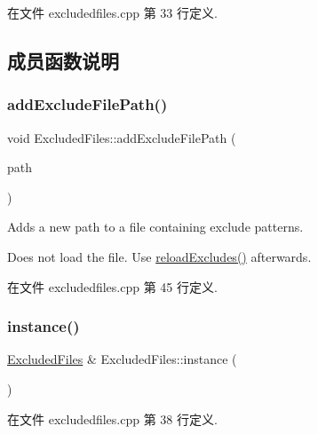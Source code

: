 在文件 excludedfiles.\+cpp 第 33 行定义.



\subsection{成员函数说明}
\mbox{\label{class_o_c_c_1_1_excluded_files_abd7010e5b9734d3870ce40e607b16a53}} 
\subsubsection{\texorpdfstring{add\+Exclude\+File\+Path()}{addExcludeFilePath()}}
{\footnotesize\ttfamily void Excluded\+Files\+::add\+Exclude\+File\+Path (\begin{DoxyParamCaption}\item[{const Q\+String \&}]{path }\end{DoxyParamCaption})}

Adds a new path to a file containing exclude patterns.

Does not load the file. Use \hyperlink{class_o_c_c_1_1_excluded_files_a725cf3074415738e3e2a4cc5aa881ef4}{reload\+Excludes()} afterwards. 

在文件 excludedfiles.\+cpp 第 45 行定义.

\mbox{\label{class_o_c_c_1_1_excluded_files_ac7ec470473506ddcddb4ef83f20c6df0}} 
\subsubsection{\texorpdfstring{instance()}{instance()}}
{\footnotesize\ttfamily \hyperlink{class_o_c_c_1_1_excluded_files}{Excluded\+Files} \& Excluded\+Files\+::instance (\begin{DoxyParamCaption}{ }\end{DoxyParamCaption})\hspace{0.3cm}{\ttfamily [static]}}



在文件 excludedfiles.\+cpp 第 38 行定义.

